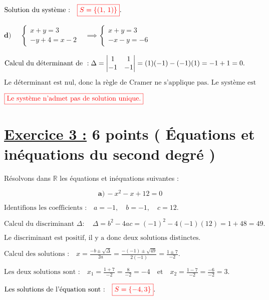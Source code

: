\documentclass[12pt,a4paper]{article}
\begin{document}
\(
\text{Solution du système :} \quad
\textcolor{red}{\boxed{S=\left\lbrace  \left( 1, \, 1 \right)  \right\rbrace }}.
\)

\(\textbf{d)} \quad
\begin{aligned}
\begin{cases}
x + y = 3 \\
-y + 4 = x - 2
\end{cases}&\implies
\begin{cases}
x + y = 3 \\
-x-y  = - 6
\end{cases}
\end{aligned}
\)

\(
\text{Calcul du déterminant de }: \\
\Delta = \left| \begin{matrix} 1 & 1 \\ -1 & -1 \end{matrix} \right| = (1)(-1) - (-1)(1) = -1 + 1 = 0.
\)

\(
\text{Le déterminant est nul, donc la règle de Cramer ne s'applique pas. Le système est soit impossible, soit indéterminé.}
\)

\(
\textcolor{red}{\boxed{\text{Le système n'admet pas de solution unique.}}}
\)

\section*{\underline{Exercice 3 :} 6 points ( Équations et inéquations du second degré )}

Résolvons dans \(\mathbb{R}\) les équations et inéquations suivantes :


\[ \textbf{a)} \, -x^2 - x + 12 = 0 \]

\(
\text{Identifions les coefficients :} \quad a = -1, \quad b = -1, \quad c = 12.
\)

\(
\text{Calcul du discriminant } \Delta : \quad
\Delta = b^2 - 4ac = (-1)^2 - 4(-1)(12) = 1 + 48 = 49.
\)

\(
\text{Le discriminant est positif, il y a donc deux solutions distinctes.}
\)

\(
\text{Calcul des solutions :} \quad
x = \frac{-b \pm \sqrt{\Delta}}{2a} = \frac{-(-1) \pm \sqrt{49}}{2(-1)} = \frac{1 \pm 7}{-2}.
\)

\(
\text{Les deux solutions sont :} \quad
x_1 = \frac{1 + 7}{-2} = \frac{8}{-2} = -4 \quad \text{et} \quad x_2 = \frac{1 - 7}{-2} = \frac{-6}{-2} = 3.
\)

\(
\text{Les solutions de l'équation sont :} \quad
\textcolor{red}{\boxed{S=\left\lbrace  -4 , 3\right\rbrace  }}.
\)
\end{document}

